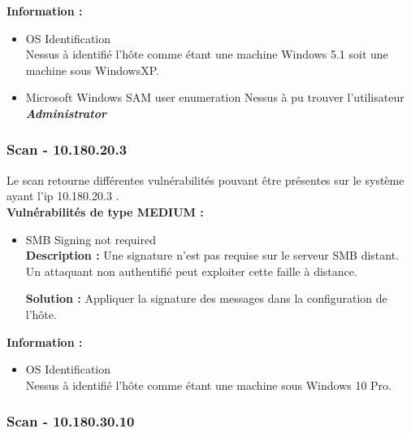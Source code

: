 \documentclass[french,paper=a4,oneside,captions=tableheading]{article}
\begin{document}
\textbf{Information :}\\

\begin{itemize}
    \item OS Identification\\
Nessus à identifié l'hôte comme étant une machine Windows 5.1 soit une machine sous WindowsXP.\\

    \item Microsoft Windows SAM user enumeration
Nessus à pu trouver l'utilisateur \textit{\textbf{Administrator}}
\end{itemize}



\subsubsection{Scan - 10.180.20.3}

Le scan retourne différentes vulnérabilités pouvant être présentes sur le système ayant l'ip 10.180.20.3 . \\
\textbf{Vulnérabilités de type MEDIUM :}\\



\begin{itemize}
    \item SMB Signing not required \\
\textbf{Description :}
Une signature n'est pas requise sur le serveur SMB distant. Un attaquant non authentifié peut exploiter cette faille à distance.

\textbf{Solution :}
Appliquer la signature des messages dans la configuration de l'hôte.\\

\end{itemize}

\textbf{Information :}\\

\begin{itemize}
    \item OS Identification\\
Nessus à identifié l'hôte comme étant une machine sous Windows 10 Pro.
\end{itemize}



\subsubsection{Scan - 10.180.30.10}
\end{document}
